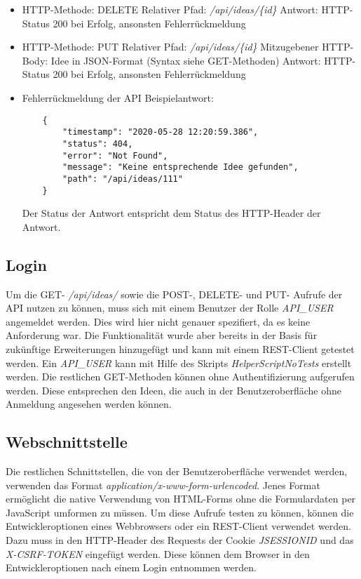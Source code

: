\begin{itemize}
    \item HTTP-Methode: DELETE
    \subitem Relativer Pfad: \textit{/api/ideas/\{id\}}
    \subitem Antwort: HTTP-Status 200 bei Erfolg, ansonsten Fehlerrückmeldung
\end{itemize}

\begin{itemize}
    \item HTTP-Methode: PUT
    \subitem Relativer Pfad: \textit{/api/ideas/\{id\}}
    \subitem Mitzugebener HTTP-Body: Idee in JSON-Format (Syntax siehe GET-Methoden)
    \subitem Antwort: HTTP-Status 200 bei Erfolg, ansonsten Fehlerrückmeldung
\end{itemize}

\begin{itemize}
    \item Fehlerrückmeldung der API
    \subitem Beispielantwort:
    \begin{verbatim}
    {
        "timestamp": "2020-05-28 12:20:59.386",
        "status": 404,
        "error": "Not Found",
        "message": "Keine entsprechende Idee gefunden",
        "path": "/api/ideas/111"
    }
    \end{verbatim}
    \subitem Der Status der Antwort entspricht dem Status des HTTP-Header der Antwort.
\end{itemize}

\subsection{Login}
Um die GET- \textit{/api/ideas/} sowie die POST-, DELETE- und PUT- Aufrufe der API nutzen zu können, muss sich mit einem Benutzer der Rolle \textit{API\_USER} angemeldet werden.
Dies wird hier nicht genauer spezifiert, da es keine Anforderung war.
Die Funktionalität wurde aber bereits in der Basis für zukünftige Erweiterungen hinzugefügt und kann mit einem REST-Client getestet werden.
Ein \textit{API\_USER} kann mit Hilfe des Skripts \textit{HelperScriptNoTests} erstellt werden.
Die restlichen GET-Methoden können ohne Authentifizierung aufgerufen werden. Diese entsprechen den Ideen, die auch in der Benutzeroberfläche ohne Anmeldung angesehen werden können.

\subsection{Webschnittstelle}
Die restlichen Schnittstellen, die von der Benutzeroberfläche verwendet werden, verwenden das Format \textit{application/x-www-form-urlencoded}.
Jenes Format ermöglicht die native Verwendung von HTML-Forms ohne die Formulardaten per JavaScript umformen zu müssen.
Um diese Aufrufe testen zu können, können die Entwickleroptionen eines Webbrowsers oder ein REST-Client verwendet werden.
Dazu muss in den HTTP-Header des Requests der Cookie \textit{JSESSIONID} und das \textit{X-CSRF-TOKEN} eingefügt werden.
Diese können dem Browser in den Entwickleroptionen nach einem Login entnommen werden.